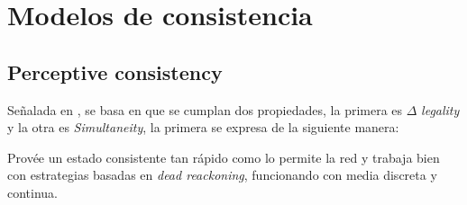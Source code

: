 \section{Modelos de consistencia}



\subsection{Perceptive consistency}

Señalada en \cite{bouillot2005fast}, se basa en que se cumplan dos propiedades, la primera es $\Delta$ \emph{legality} y la otra es \emph{Simultaneity}, la primera se expresa de la siguiente manera:



Provée un estado consistente tan rápido como lo permite la red y trabaja bien con estrategias basadas en \emph{dead reackoning}, funcionando con media discreta y continua.



